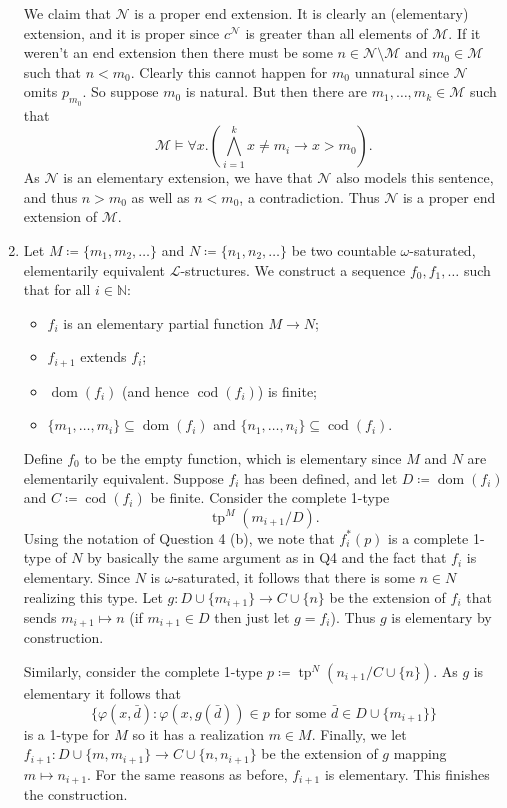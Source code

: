 \documentclass{article}
\theoremstyle{theorem}
\DeclareMathOperator{\tp}{tp}
\DeclareMathOperator{\dom}{dom}
\DeclareMathOperator{\cod}{cod}
\begin{document}
\begin{enumerate}[leftmargin=*]
		We claim that $\mathcal{N}$ is a proper end extension. It is clearly an (elementary) extension, and it is proper since $c^{\mathcal{N}}$ is greater than all elements of $\mathcal{M}$. If it weren't an end extension then there must be some $n\in\mathcal{N}\setminus\mathcal{M}$ and $m_0\in\mathcal{M}$ such that $n<m_0$. Clearly this cannot happen for $m_0$ unnatural since $\mathcal{N}$ omits $p_{m_0}$. So suppose $m_0$ is natural. But then there are $m_1,\ldots,m_k\in \mathcal{M}$ such that
		\[
		\mathcal{M} \models \forall x. \left(\bigwedge_{i=1}^k x \neq m_i \rightarrow x > m_0\right).
		\] 
		As $\mathcal{N}$ is an elementary extension, we have that $\mathcal{N}$ also models this sentence, and thus $n > m_0$ as well as $n < m_0$, a contradiction. Thus $\mathcal{N}$ is a proper end extension of $\mathcal{M}$.
		\item Let $M \coloneqq \{m_1, m_2, \ldots\}$ and $N \coloneqq \{n_1,n_2,\ldots\}$ be two countable $\omega$-saturated, elementarily equivalent $\mathcal{L}$-structures. We construct a sequence $f_0,f_1,\ldots$ such that for all $i\in \mathbb{N}$:
		\begin{itemize}
			\item $f_i$ is an elementary partial function $M\to N$;
			\item $f_{i+1}$ extends $f_i$;
			\item $\dom(f_i)$ (and hence $\cod(f_i)$) is finite;
			\item $\{m_1,\ldots,m_i\}\subseteq \dom(f_i)$ and $\{n_1,\ldots,n_i\}\subseteq \cod(f_i)$.
		\end{itemize}
		
		Define $f_0$ to be the empty function, which is elementary since $M$ and $N$ are elementarily equivalent. Suppose $f_i$ has been defined, and let $D\coloneqq \dom(f_i)$ and $C\coloneqq \cod(f_i)$ be finite. Consider the complete 1-type
		\[
			\tp^M(m_{i+1}/D).
		\]
		Using the notation of Question 4 (b), we note that $f_i^*(p)$ is a complete 1-type of $N$ by basically the same argument as in Q4 and the fact that $f_i$ is elementary. Since $N$ is $\omega$-saturated, it follows that there is some $n\in N$ realizing this type. Let $g\colon D\cup\{m_{i+1}\} \to C\cup\{n\}$ be the extension of $f_i$ that sends $m_{i+1}\mapsto n$ (if $m_{i+1}\in D$ then just let $g=f_i$). Thus $g$ is elementary by construction.
		
		Similarly, consider the complete 1-type $p\coloneqq \tp^N(n_{i+1}/C\cup\{n\})$. As $g$ is elementary it follows that 
		\[\{\varphi(x,\bar{d}) \colon \varphi(x,g(\bar{d}))\in p\text{ for some $\bar{d}\in D\cup\{m_{i+1}\}$}\}\]
		is a 1-type for $M$ so it has a realization $m\in M$. Finally, we let $f_{i+1} \colon D\cup\{m,m_{i+1}\}\to C\cup\{n,n_{i+1}\}$ be the extension of $g$ mapping $m\mapsto n_{i+1}$. For the same reasons as before, $f_{i+1}$ is elementary. This finishes the construction.
		

\end{enumerate}
\end{document}
